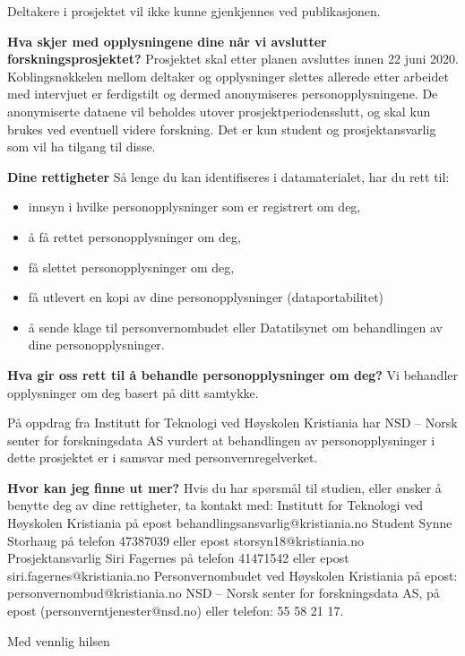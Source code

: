 Deltakere i prosjektet vil ikke kunne gjenkjennes ved publikasjonen. 

\textbf{Hva skjer med opplysningene dine når vi avslutter forskningsprosjektet?}
\bigbreak
Prosjektet skal etter planen avsluttes innen 22 juni 2020. Koblingsnøkkelen mellom deltaker og opplysninger slettes allerede etter arbeidet med intervjuet er ferdigstilt og dermed anonymiseres personopplysningene. De anonymiserte dataene vil beholdes utover prosjektperiodensslutt, og skal kun brukes ved eventuell videre forskning. Det er kun student og prosjektansvarlig som vil ha tilgang til disse. 
 
\textbf{Dine rettigheter}
\bigbreak
Så lenge du kan identifiseres i datamaterialet, har du rett til:

\begin{itemize}
\item innsyn i hvilke personopplysninger som er registrert om deg, 
\item å få rettet personopplysninger om deg,
\item få slettet personopplysninger om deg, 
\item få utlevert en kopi av dine personopplysninger (dataportabilitet)
\item å sende klage til personvernombudet eller Datatilsynet om behandlingen av dine personopplysninger.
\end{itemize}
 
\textbf{Hva gir oss rett til å behandle personopplysninger om deg?}
Vi behandler opplysninger om deg basert på ditt samtykke.
 
På oppdrag fra Institutt for Teknologi ved Høyskolen Kristiania har NSD – Norsk senter for forskningsdata AS vurdert at behandlingen av personopplysninger i dette prosjektet er i samsvar med personvernregelverket.
 
\textbf{Hvor kan jeg finne ut mer?}
Hvis du har spørsmål til studien, eller ønsker å benytte deg av dine rettigheter, ta kontakt med:
Institutt for Teknologi ved Høyskolen Kristiania på epost behandlingsansvarlig@kristiania.no 
Student Synne Storhaug på telefon 47387039 eller epost storsyn18@kristiania.no 
Prosjektansvarlig Siri Fagernes på telefon 41471542 eller epost siri.fagernes@kristiania.no 
Personvernombudet ved Høyskolen Kristiania på epost: personvernombud@kristiania.no  
NSD – Norsk senter for forskningsdata AS, på epost (personverntjenester@nsd.no) eller telefon: 55 58 21 17.
 
 
Med vennlig hilsen
 
